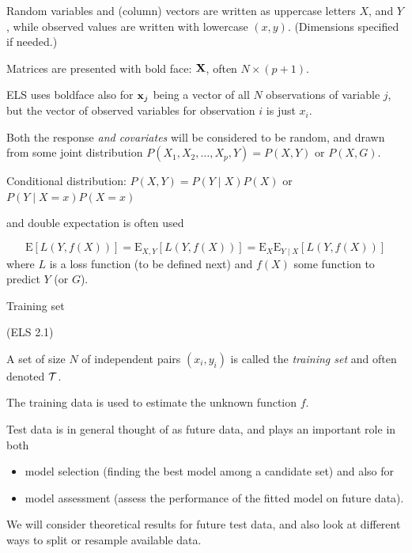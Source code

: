 \documentclass[
  ignorenonframetext,
]{beamer}
\providecommand{\tightlist}{%
  \setlength{\itemsep}{0pt}\setlength{\parskip}{0pt}}
\begin{document}
\begin{frame}

Random variables and (column) vectors are written as uppercase letters
\(X\), and \(Y\), while observed values are written with lowercase
\((x,y)\). (Dimensions specified if needed.)

Matrices are presented with bold face: \({\bf X}\), often
\(N \times (p+1)\).

ELS uses boldface also for \({\bf x}_j\) being a vector of all \(N\)
observations of variable \(j\), but the vector of observed variables for
observation \(i\) is just \(x_i\).

\end{frame}

\begin{frame}

Both the response \emph{and covariates} will be considered to be random,
and drawn from some joint distribution
\(P(X_1,X_2,\ldots, X_p,Y)=P(X,Y)\) or \(P(X,G)\).

Conditional distribution: \(P(X,Y)=P(Y \mid X)P(X)\) or
\(P(Y\mid X=x)P(X=x)\)

and double expectation is often used

\[\text{E}[L(Y,f(X))]=\text{E}_{X,Y}[L(Y,f(X))]=\text{E}_{X}\text{E}_{Y \mid X}[L(Y,f(X))]\]
where \(L\) is a loss function (to be defined next) and \(f(X)\) some
function to predict \(Y\) (or \(G\)).

\end{frame}

\begin{frame}

\begin{block}{Training set}

(ELS 2.1)

A set of size \(N\) of independent pairs \((x_i,y_i)\) is called the
\emph{training set} and often denoted \({\cal T}\).

The training data is used to estimate the unknown function \(f\).

Test data is in general thought of as future data, and plays an
important role in both

\begin{itemize}
\tightlist
\item
  model selection (finding the best model among a candidate set) and
  also for
\item
  model assessment (assess the performance of the fitted model on future
  data).
\end{itemize}

We will consider theoretical results for future test data, and also look
at different ways to split or resample available data.

\end{block}

\end{frame}
\end{document}
